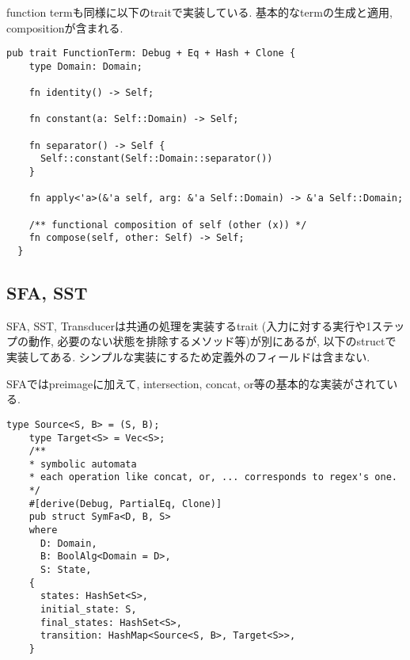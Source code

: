 \documentclass[uplatex,dvipdfmx,a4j]{jsreport}
\begin{document}
  function termも同様に以下のtraitで実装している. 基本的なtermの生成と適用, compositionが含まれる.
  \begin{lstlisting}[caption={function term}, label=function_term_impl]
  pub trait FunctionTerm: Debug + Eq + Hash + Clone {
    type Domain: Domain;

    fn identity() -> Self;

    fn constant(a: Self::Domain) -> Self;

    fn separator() -> Self {
      Self::constant(Self::Domain::separator())
    }

    fn apply<'a>(&'a self, arg: &'a Self::Domain) -> &'a Self::Domain;

    /** functional composition of self (other (x)) */
    fn compose(self, other: Self) -> Self;
  }
  \end{lstlisting}

  \subsection{SFA, SST}
  SFA, SST, Transducerは共通の処理を実装するtrait
  (入力に対する実行や1ステップの動作, 必要のない状態を排除するメソッド等)が別にあるが,
  以下のstructで実装してある. シンプルな実装にするため定義外のフィールドは含まない.

  SFAではpreimageに加えて, intersection, concat, or等の基本的な実装がされている.
  \begin{lstlisting}[caption=SFA, label=sfa_impl]
    type Source<S, B> = (S, B);
    type Target<S> = Vec<S>;
    /**
    * symbolic automata
    * each operation like concat, or, ... corresponds to regex's one.
    */
    #[derive(Debug, PartialEq, Clone)]
    pub struct SymFa<D, B, S>
    where
      D: Domain,
      B: BoolAlg<Domain = D>,
      S: State,
    {
      states: HashSet<S>,
      initial_state: S,
      final_states: HashSet<S>,
      transition: HashMap<Source<S, B>, Target<S>>,
    }
  \end{lstlisting}
\end{document}
